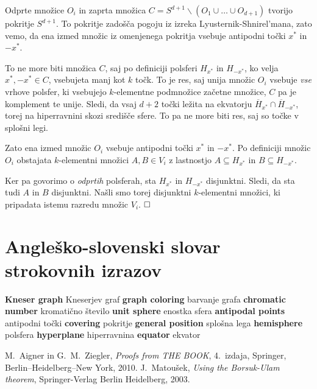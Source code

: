 \documentclass[a4paper,12pt]{article}
\newcommand{\geslo}[2]{\textbf{#1} \quad #2\newline}
\def\qed{$\hfill\Box$}   %
\begin{document}
Odprte množice $O_i$ in zaprta množica $C = S^{d+1} \backslash (O_1 \cup \ldots \cup O_{d+1})$ tvorijo pokritje $S^{d+1}$. To pokritje zadošča pogoju iz izreka Lyusternik-Shnirel'mana, zato vemo, da ena izmed množic iz omenjenega pokritja vsebuje antipodni točki $x^*$ in $-x^*$. 

To ne more biti množica $C$, saj po definiciji polsferi $H_{x^*}$ in $H_{-x^*}$, ko velja $x^*, -x^* \in C$, vsebujeta manj kot $k$ točk. To je res, saj unija množic $O_i$ vsebuje {\em vse} vrhove polsfer, ki vsebujejo $k$-elementne podmnožice začetne množice, $C$ pa je komplement te unije. Sledi, da vsaj $d+2$ točki ležita na ekvatorju $\overline H_{x^*} \cap \overline H_{-x^*}$, torej na hiperravnini skozi središče sfere. To pa ne more biti res, saj so točke v splošni legi.

Zato ena izmed množic $O_i$ vsebuje antipodni točki $x^*$ in $-x^*$. Po definiciji množic $O_i$  obstajata \mbox{$k$-elementni} množici $A, B \in V_i$ z lastnostjo $A \subseteq H_{x^*}$ in $B \subseteq H_{-x^*}$. 

Ker pa govorimo o {\em odprtih} polsferah, sta $H_{x^*}$ in $H_{-x^*}$ disjunktni. Sledi, da sta tudi $A$ in $B$ disjunktni. Našli smo torej disjunktni $k$-elementni množici, ki pripadata istemu razredu množic $V_i$. \qed


\newpage

\section*{Angleško-slovenski slovar strokovnih izrazov}

\geslo{Kneser graph}{Kneserjev graf}
\geslo{graph coloring}{barvanje grafa}
\geslo{chromatic number}{kromatično število}
\geslo{unit sphere}{enostka sfera}
\geslo{antipodal points}{antipodni točki}
\geslo{covering}{pokritje}
\geslo{general position}{splošna lega}
\geslo{hemisphere}{polsfera}
\geslo{hyperplane}{hiperravnina}
\geslo{equator}{ekvator}

\begin{thebibliography}{1}

M.~Aigner in G.~M.~Ziegler, \emph{Proofs from THE BOOK}, 4.\ izdaja, Springer, Berlin--Heidelberg--New York, 2010.
J.~Matoušek, \emph{Using the Borsuk-Ulam theorem}, Springer-Verlag Berlin Heidelberg, 2003.

\end{thebibliography}
\end{document}
